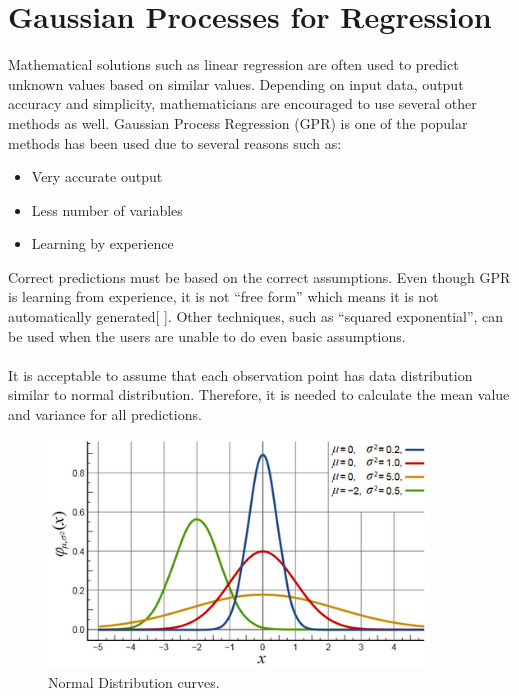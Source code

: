 \section{Gaussian Processes for Regression}
Mathematical solutions such as linear regression are often used to predict unknown values based on similar values. Depending on input data, output accuracy and simplicity, mathematicians are encouraged to use several other methods as well.
Gaussian Process Regression (GPR) is one of the popular methods has been used due to several reasons such as:
\begin{itemize}
\item Very accurate output
\item Less number of variables
\item Learning by experience
\end{itemize}
Correct predictions must be based on the correct assumptions. Even though GPR is  learning from experience, it is not “free form” which means it is not automatically generated[ ]. Other techniques, such as “squared exponential”, can be used when the users are unable to do even basic assumptions.
\\\\
It is acceptable to assume that each observation point has data distribution similar to normal distribution. Therefore, it is needed  to calculate the mean value and variance for all predictions.
\begin{figure}[here]
  \centering
      \includegraphics[width=0.9\textwidth]{theory/graphics/normal-distribution.png}
  \caption{Normal Distribution curves\cite{normal-dist}. }
  \label{fig:normal-distribution}
\end{figure}
